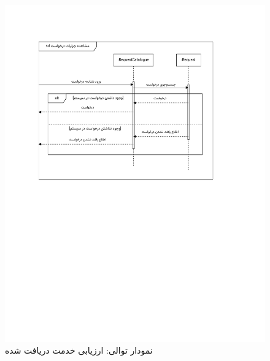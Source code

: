 \begin{figure}[ht!]
	\centering
	\includegraphics[scale=0.6, page=11]{figs/OOD-Sequence-2.pdf}
	\caption{نمودار توالی: ارزیابی خدمت دریافت شده}
\end{figure}
\FloatBarrier
\newpage

